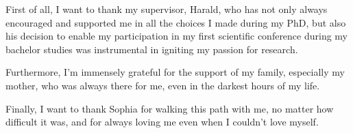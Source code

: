 First of all, I want to thank my supervisor, Harald, who has not only always encouraged and supported me in all the choices I made during my PhD, but also his decision to enable my participation in my first scientific conference during my bachelor studies was instrumental in igniting my passion for research.


Furthermore, I'm immensely grateful for the support of my family, especially my mother, who was always there for me, even in the darkest hours of my life.

Finally, I want to thank Sophia for walking this path with me, no matter how difficult it was, and for always loving me even when I couldn't love myself.